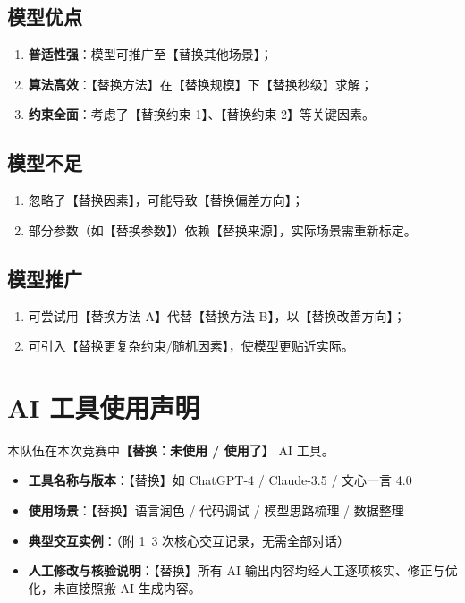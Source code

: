 \documentclass[12pt,a4paper,fontset=fandol]{ctexart}
\begin{document}
\subsection{模型优点}
\begin{enumerate}
    \item \textbf{普适性强}：模型可推广至【替换其他场景】；
    \item \textbf{算法高效}：【替换方法】在【替换规模】下【替换秒级】求解；
    \item \textbf{约束全面}：考虑了【替换约束 1】、【替换约束 2】等关键因素。
\end{enumerate}

\subsection{模型不足}
\begin{enumerate}
    \item 忽略了【替换因素】，可能导致【替换偏差方向】；
    \item 部分参数（如【替换参数】）依赖【替换来源】，实际场景需重新标定。
\end{enumerate}

\subsection{模型推广}
\begin{enumerate}
    \item 可尝试用【替换方法 A】代替【替换方法 B】，以【替换改善方向】；
    \item 可引入【替换更复杂约束/随机因素】，使模型更贴近实际。
\end{enumerate}

\section*{AI 工具使用声明}

本队伍在本次竞赛中\textbf{【替换：未使用 / 使用了】} AI 工具。

\begin{itemize}
    \item \textbf{工具名称与版本}：【替换】如 ChatGPT-4 / Claude-3.5 / 文心一言 4.0
    \item \textbf{使用场景}：【替换】语言润色 / 代码调试 / 模型思路梳理 / 数据整理
    \item \textbf{典型交互实例}：（附 1~3 次核心交互记录，无需全部对话）
    \item \textbf{人工修改与核验说明}：【替换】所有 AI 输出内容均经人工逐项核实、修正与优化，未直接照搬 AI 生成内容。
\end{itemize}
\end{document}
